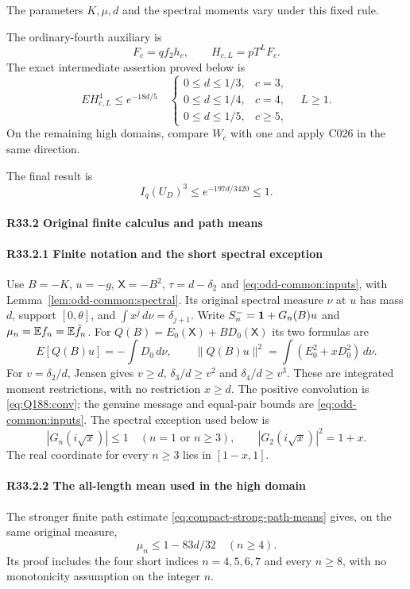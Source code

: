 The parameters \(K,\allowbreak \allowbreak  \mu,\allowbreak \allowbreak  d\) and the spectral moments vary under this fixed rule.

The ordinary-fourth auxiliary is
\[
F_c=qf_2h_c,\qquad H_{c,L}=pT^LF_c.
\]
The exact intermediate assertion proved below is
\[
EH_{c,L}^4\le e^{-18d/5}
\quad\begin{cases}
0\le d\le1/3,&c=3,\\
0\le d\le1/4,&c=4,\\
0\le d\le1/5,&c\ge5,
\end{cases}
\quad L\ge1.                                      \tag{R33.A2}
\]
On the remaining high domains, compare \(W_c\) with one and apply
C026 in the same direction.

The final result is
\[
\boxed{I_q(U_D)^3\le e^{-197d/3420}\le1.}             \tag{R33.A3}
\]

\paragraph{R33.2 Original finite calculus and path means}

\paragraph{R33.2.1 Finite notation and the short spectral exception}
\label{part:R33.2.1}
Use $B=-K$, $u=-g$, $\mathsf X=-B^2$, $\tau=d-\delta_2$ and
\eqref{eq:odd-common:inputs}, with Lemma~\ref{lem:odd-common:spectral}.
Its original spectral measure $\nu$ at $u$ has mass $d$,
support $[0,\theta]$, and $\int x^j\,d\nu=\delta_{j+1}$.
Write $S_n^-=\mathbf1+G_n(B)u$ and
$\mu_n=\mathbb E f_n=\mathbb E\bar f_n$.
For $Q(B)=E_0(\mathsf X)+BD_0(\mathsf X)$ its two formulas are
\[
 E[Q(B)u]=-\int D_0\,d\nu,\qquad
 \|Q(B)u\|^2=\int(E_0^2+xD_0^2)\,d\nu.\tag{R33.A5}
\]
For $v=\delta_2/d$, Jensen gives
$v\ge d$, $\delta_3/d\ge v^2$ and $\delta_4/d\ge v^3$.
These are integrated moment restrictions, with no restriction $x\ge d$.
The positive convolution is \eqref{eq:Q188:conv}; the genuine
message and equal-pair bounds are \eqref{eq:odd-common:inputs}.
The spectral exception used below is
\[
 |G_n(i\sqrt x)|\le1\quad(n=1\text{ or }n\ge3),\qquad
 |G_2(i\sqrt x)|^2=1+x.\tag{R33.A7}
\]
The real coordinate for every $n\ge3$ lies in $[1-x,1]$.

\paragraph{R33.2.2 The all-length mean used in the high domain}
The stronger finite path estimate \eqref{eq:compact-strong-path-means}
gives, on the same original measure,
\[
 \boxed{\mu_n\le1-83d/32\quad(n\ge4).}\tag{R33.A9}
\]
Its proof includes the four short indices \(n=4,5,6,7\) and every
\(n\ge8\), with no monotonicity assumption on the integer \(n\).

